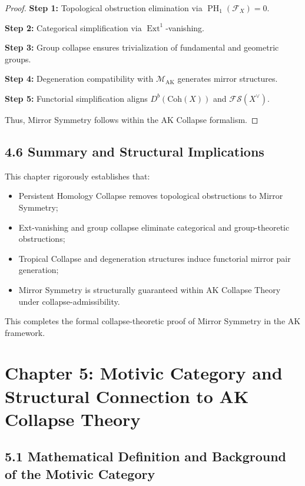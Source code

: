 \documentclass[11pt]{article}
\DeclareMathOperator{\Ext}{Ext}
\DeclareMathOperator{\PH}{PH}
\begin{document}
\begin{proof}
\textbf{Step 1:} Topological obstruction elimination via $\PH_1(\mathcal{F}_X) = 0$.

\textbf{Step 2:} Categorical simplification via $\Ext^1$-vanishing.

\textbf{Step 3:} Group collapse ensures trivialization of fundamental and geometric groups.

\textbf{Step 4:} Degeneration compatibility with $\mathcal{M}_{\mathrm{AK}}$ generates mirror structures.

\textbf{Step 5:} Functorial simplification aligns $D^b(\mathrm{Coh}(X))$ and $\mathcal{F}\mathcal{S}(X^\vee)$.

Thus, Mirror Symmetry follows within the AK Collapse formalism.
\end{proof}

\subsection{4.6 Summary and Structural Implications}

This chapter rigorously establishes that:

\begin{itemize}
    \item Persistent Homology Collapse removes topological obstructions to Mirror Symmetry;
    \item Ext-vanishing and group collapse eliminate categorical and group-theoretic obstructions;
    \item Tropical Collapse and degeneration structures induce functorial mirror pair generation;
    \item Mirror Symmetry is structurally guaranteed within AK Collapse Theory under collapse-admissibility.
\end{itemize}

This completes the formal collapse-theoretic proof of Mirror Symmetry in the AK framework.

\FloatBarrier



\section{Chapter 5: Motivic Category and Structural Connection to AK Collapse Theory}

\subsection{5.1 Mathematical Definition and Background of the Motivic Category}
\end{document}
